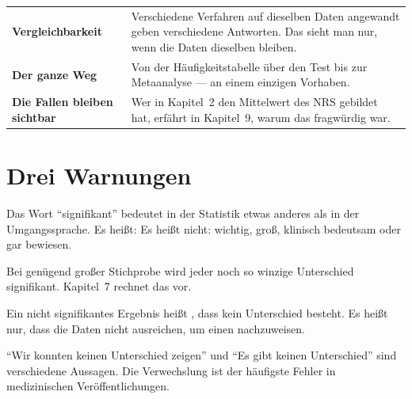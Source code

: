 \begin{merksatz}
\begin{center}
\renewcommand{\arraystretch}{1.5}
\begin{tabular}{@{}P{3.0cm}P{5.6cm}@{}}
\toprule
\textbf{Vergleich\-barkeit} & Verschiedene Verfahren auf dieselben Daten angewandt geben verschiedene Antworten. Das sieht man nur, wenn die Daten dieselben bleiben.\\
\textbf{Der ganze Weg} & Von der Häufigkeitstabelle über den Test bis zur Metaanalyse --- an einem einzigen Vorhaben.\\
\textbf{Die Fallen bleiben sichtbar} & Wer in Kapitel~2 den Mittelwert des NRS gebildet hat, erfährt in Kapitel~9, warum das fragwürdig war.\\
\bottomrule
\end{tabular}
\end{center}
\end{merksatz}

\section*{Drei Warnungen}

\begin{warnung}
Das Wort \enquote{signifikant} bedeutet in der Statistik etwas anderes als in der Umgangssprache. Es heißt:  Es heißt nicht: wichtig, groß, klinisch bedeutsam oder gar bewiesen.

Bei genügend großer Stichprobe wird jeder noch so winzige Unterschied signifikant. Kapitel~7 rechnet das vor.
\end{warnung}

\begin{warnung}
Ein nicht signifikantes Ergebnis heißt , dass kein Unterschied besteht. Es heißt nur, dass die Daten nicht ausreichen, um einen nachzuweisen.

\enquote{Wir konnten keinen Unterschied zeigen} und \enquote{Es gibt keinen Unterschied} sind verschiedene Aussagen. Die Verwechslung ist der häufigste Fehler in medizinischen Veröffentlichungen.
\end{warnung}

